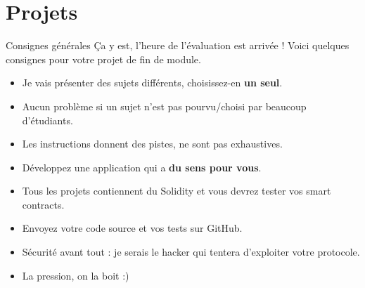 \section{Projets}

\begin{frame}{Consignes générales}
  Ça y est, l'heure de l'évaluation est arrivée !
  Voici quelques consignes pour votre projet de fin de module.

  \begin{itemize}
    \item Je vais présenter des sujets différents, choisissez-en \textbf{un seul}.
    \item Aucun problème si un sujet n'est pas pourvu/choisi par beaucoup d'étudiants.
    \item Les instructions donnent des pistes, ne sont pas exhaustives.
    \item Développez une application qui a \textbf{du sens pour vous}.
    \item Tous les projets contiennent du Solidity et vous devrez tester vos smart contracts.
    \item Envoyez votre code source et vos tests sur GitHub.
    \item Sécurité avant tout : je serais le hacker qui tentera d'exploiter votre protocole.
    \item La pression, on la boit :)
  \end{itemize}
\end{frame}







